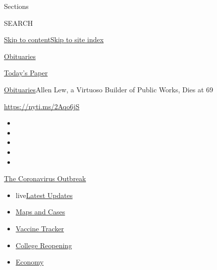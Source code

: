Sections

SEARCH

\protect\hyperlink{site-content}{Skip to
content}\protect\hyperlink{site-index}{Skip to site index}

\href{https://www.nytimes3xbfgragh.onion/section/obituaries}{Obituaries}

\href{https://myaccount.nytimes3xbfgragh.onion/auth/login?response_type=cookie\&client_id=vi}{}

\href{https://www.nytimes3xbfgragh.onion/section/todayspaper}{Today's
Paper}

\href{/section/obituaries}{Obituaries}\textbar{}Allen Lew, a Virtuoso
Builder of Public Works, Dies at 69

\url{https://nyti.ms/2Aqo6jS}

\begin{itemize}
\item
\item
\item
\item
\item
\end{itemize}

\href{https://www.nytimes3xbfgragh.onion/news-event/coronavirus?action=click\&pgtype=Article\&state=default\&region=TOP_BANNER\&context=storylines_menu}{The
Coronavirus Outbreak}

\begin{itemize}
\tightlist
\item
  live\href{https://www.nytimes3xbfgragh.onion/2020/08/04/world/coronavirus-covid-19.html?action=click\&pgtype=Article\&state=default\&region=TOP_BANNER\&context=storylines_menu}{Latest
  Updates}
\item
  \href{https://www.nytimes3xbfgragh.onion/interactive/2020/us/coronavirus-us-cases.html?action=click\&pgtype=Article\&state=default\&region=TOP_BANNER\&context=storylines_menu}{Maps
  and Cases}
\item
  \href{https://www.nytimes3xbfgragh.onion/interactive/2020/science/coronavirus-vaccine-tracker.html?action=click\&pgtype=Article\&state=default\&region=TOP_BANNER\&context=storylines_menu}{Vaccine
  Tracker}
\item
  \href{https://www.nytimes3xbfgragh.onion/2020/08/02/us/covid-college-reopening.html?action=click\&pgtype=Article\&state=default\&region=TOP_BANNER\&context=storylines_menu}{College
  Reopening}
\item
  \href{https://www.nytimes3xbfgragh.onion/live/2020/08/03/business/stock-market-today-coronavirus?action=click\&pgtype=Article\&state=default\&region=TOP_BANNER\&context=storylines_menu}{Economy}
\end{itemize}

